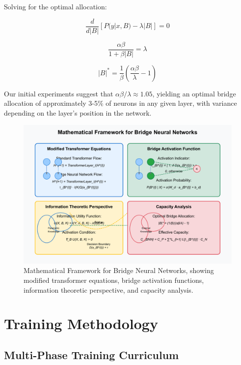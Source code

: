 \documentclass[9pt,a4paper,twocolumn,twoside]{tau-class/tau}
\begin{document}
    Solving for the optimal allocation:

    \begin{equation}
    \frac{d}{d|B|} [P(y|x,B) - \lambda |B|] = 0
    \end{equation}

    \begin{equation}
    \frac{\alpha\beta}{1 + \beta |B|} = \lambda
    \end{equation}

    \begin{equation}
    |B|^* = \frac{1}{\beta}(\frac{\alpha\beta}{\lambda} - 1)
    \end{equation}

    Our initial experiments suggest that $\alpha\beta/\lambda \approx 1.05$, yielding an optimal bridge allocation of approximately 3-5\% of neurons in any given layer, with variance depending on the layer's position in the network.

    \begin{figure}[h]
        \centering
        \includegraphics[width=\columnwidth]{figures/figure4_mathematical_framework.pdf}
        \caption{Mathematical Framework for Bridge Neural Networks, showing modified transformer equations, bridge activation functions, information theoretic perspective, and capacity analysis.}
        \label{fig:framework}
    \end{figure}

\section{Training Methodology}

\subsection{Multi-Phase Training Curriculum}
\end{document}
